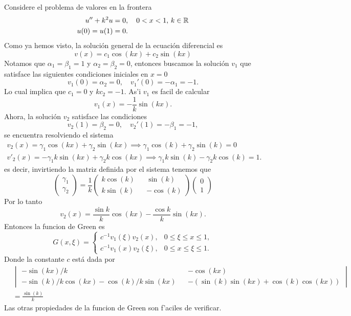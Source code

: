 \documentclass[main.tex]{subfiles}
\begin{document}
\eje Considere el problema de valores en la frontera
\begin{align*}
u'' + k^2 u &= 0, \quad 0 < x < 1,\,k\in\mathbb R \\
u(0) = u(1) &= 0.
\end{align*}
Como ya hemos visto, la solución general de la ecuación diferencial es
\[
  v(x) = c_1 \cos(kx) + c_2 \sin(kx)
\]
Notamos que $\alpha_1=\beta_1=1$ y $\alpha_2=\beta_2=0$, entonces buscamos la solución $v_1$ que satisface las siguientes condiciones iniciales en $x = 0$
\[
v_1(0) = \alpha_2 = 0, \quad v_1'(0) = -\alpha_1 = -1.
\]
Lo cual implica que $c_1=0$ y $kc_2= -1$. As'i $v_{1}$ es facil de calcular
\[
v_1(x) = -\frac{1}{k} \sin(kx).
\]
Ahora, la solución $v_2$ satisface las condiciones
\[
v_2(1) = \beta_2 = 0, \quad v_2'(1) = -\beta_1 = -1,
\]
se encuentra resolviendo el sistema
\begin{align*}
  v_{2}(x)=\gamma_{1}\cos(kx)+\gamma_{2}\sin(kx)\implies\gamma_{1}\cos(k)+\gamma_{2}\sin(k)=0\\
  v'_{2}(x)=-\gamma_{1}k\sin(kx)+\gamma_{2}k\cos(kx)\implies\gamma_{1}k\sin(k)-\gamma_{2}k\cos(k)=1.
\end{align*}
es decir, invirtiendo la matriz definida por el sistema tenemos que
\begin{equation}
  \begin{pmatrix}
    \gamma_{1}\\
    \gamma_{2}
  \end{pmatrix} = \frac{1}{k}
  \begin{pmatrix}
    k\cos(k) && \sin(k)\\
    k\sin(k) && -\cos(k)
  \end{pmatrix}
  \begin{pmatrix}
    0\\
    1
  \end{pmatrix}
\end{equation}
Por lo tanto
\[
  v_2(x) = \frac{\sin k}{k} \cos(kx) - \frac{\cos k}{k} \sin(kx).
\]
Entonces la funcion de Green es
\begin{equation}
G(x, \xi) =
\begin{cases}
c^{-1} v_1(\xi)v_2(x), & 0 \leq \xi \leq x \leq 1, \\
c^{-1} v_1(x)v_2(\xi), & 0 \leq x \leq \xi \leq 1.
\end{cases}
\end{equation}
Donde la constante $c$ está dada por 
\begin{align*}
  &\begin{vmatrix}
    -\sin(kx)/k && -\cos(kx)\\
    -\sin(k)/k\cos(kx)-\cos(k)/k\sin(kx) && -(\sin(k)\sin(kx)+\cos(k)\cos(kx))
  \end{vmatrix}\\
  &=\frac{\sin(k)}{k}
\end{align*}
Las otras propiedades de la funcion de Green son f'aciles de verificar.
\end{document}
